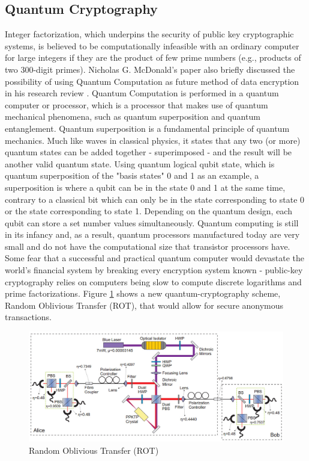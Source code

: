 \documentclass[journal]{IEEEtran}
\begin{document}
\subsection{\textbf{Quantum Cryptography}}
Integer factorization, which underpins the security of public key cryptographic systems, is believed to be computationally infeasible with an ordinary computer for large integers if they are the product of few prime numbers (e.g., products of two 300-digit primes). Nicholas G. McDonald's paper also briefly discussed the possibility of using Quantum Computation as future method of data encryption in his research review \cite{encryption_research}. Quantum Computation is performed in a quantum computer or processor, which is a processor that makes use of quantum mechanical phenomena, such as quantum superposition and quantum entanglement. Quantum superposition is a fundamental principle of quantum mechanics. Much like waves in classical physics, it states that any two (or more) quantum states can be added together - superimposed - and the result will be another valid quantum state. Using quantum logical qubit state, which is quantum superposition of the "basis states" 0 and 1 as an example, a superposition is where a qubit can be in the state 0 and 1 at the same time, contrary to a classical bit which can only be in the state corresponding to state 0 or the state corresponding to state 1. Depending on the quantum design, each qubit can store a set number values simultaneously. Quantum computing is still in its infancy and, as a result, quantum processors manufactured today are very small and do not have the computational size that transistor processors have. Some fear that a successful and practical quantum computer would devastate the world's financial system by breaking every encryption system known - public-key cryptography relies on computers being slow to compute discrete logarithms and prime factorizations. Figure \ref{fig:rot} shows a new quantum-cryptography scheme, Random Oblivious Transfer (ROT), that would allow for secure anonymous transactions.

\newline
\begin{figure}[!h]
    \centering
    \includegraphics[scale=.35]{ROT-experiment}
    \caption{Random Oblivious Transfer (ROT)}
    \label{fig:rot}
\end{figure}
\end{document}
